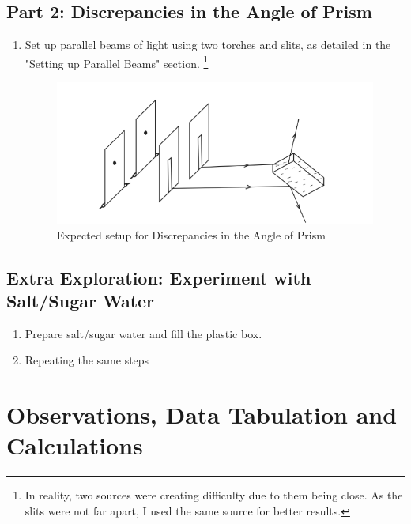 \documentclass[twocolumn,11pt]{article}
\begin{document}
\subsection{Part 2: Discrepancies in the Angle of Prism}
\begin{enumerate}
    \item Set up parallel beams of light using two torches and slits, as detailed in the "Setting up Parallel Beams" section. \footnote{In reality, two sources were creating difficulty due to them being close. As the slits were not far apart, I used the same source for better results.}
        \begin{figure}[H]
        \centering
        \includegraphics[scale =0.5]{Given setup for tir.png}
        \caption{Expected setup for Discrepancies in the Angle of Prism}
        \label{Illustration of the Experimental procedure}
    \end{figure}

    
\end{enumerate}

\subsection{Extra Exploration: Experiment with Salt/Sugar Water}
\begin{enumerate}
    \item Prepare salt/sugar water and fill the plastic box.
    \item Repeating the same steps
    
\end{enumerate}

\section{Observations, Data Tabulation and Calculations}
\end{document}
